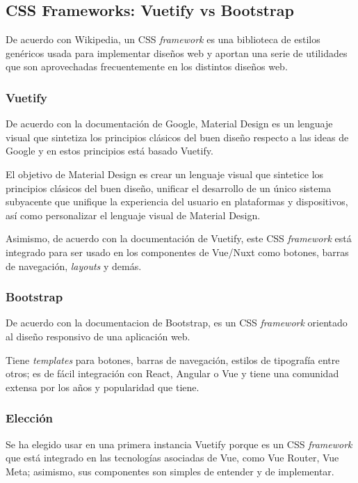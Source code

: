 \subsection{CSS Frameworks: Vuetify vs Bootstrap}
De acuerdo con Wikipedia\cite{wikipedia_contributors_css_2020}, un CSS \textit{framework} es una biblioteca de estilos genéricos usada para implementar diseños web y aportan una serie de utilidades que son aprovechadas frecuentemente en los distintos diseños web.

\subsubsection*{Vuetify}
De acuerdo con la documentación de Google\cite{noauthor_introduction_nodate}, Material Design es un lenguaje visual que sintetiza los principios clásicos del buen diseño respecto a las ideas de Google y en estos principios está basado Vuetify.


El objetivo de Material Design es crear un lenguaje visual que sintetice los principios clásicos del buen diseño, unificar el desarrollo de un único sistema subyacente que unifique la experiencia del usuario en plataformas y dispositivos, así como personalizar el lenguaje visual de Material Design.


Asimismo, de acuerdo con la documentación de Vuetify\cite{noauthor_vuetify_nodate}, este CSS \textit{framework} está integrado para ser usado en los componentes de Vue/Nuxt como botones, barras de navegación, \textit{layouts} y demás.

\subsubsection*{Bootstrap}
De acuerdo con la documentacion de Bootstrap\cite{noauthor_documentation_nodate-1}, es un CSS \textit{framework} orientado al diseño responsivo de una aplicación web. 


Tiene \textit{templates} para botones, barras de navegación, estilos de tipografía entre otros; es de fácil integración con React, Angular o Vue y tiene una comunidad extensa por los años y popularidad que tiene.

\subsubsection*{Elección}

Se ha elegido usar en una primera instancia Vuetify porque es un CSS \textit{framework} que está integrado en las tecnologías asociadas de Vue, como Vue Router, Vue Meta; asimismo, sus componentes son simples de entender y de implementar.
